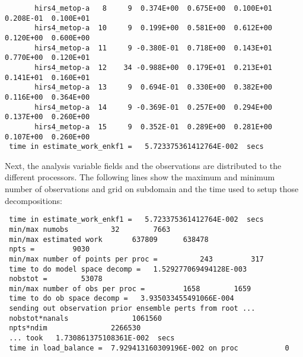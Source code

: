 \begin{scriptsize}
\begin{verbatim}
       hirs4_metop-a   8     9  0.374E+00  0.675E+00  0.100E+01  0.208E-01  0.100E+01
       hirs4_metop-a  10     9  0.199E+00  0.581E+00  0.612E+00  0.120E+00  0.600E+00
       hirs4_metop-a  11     9 -0.380E-01  0.718E+00  0.143E+01  0.770E+00  0.120E+01
       hirs4_metop-a  12    34 -0.988E+00  0.179E+01  0.213E+01  0.141E+01  0.160E+01
       hirs4_metop-a  13     9  0.694E-01  0.330E+00  0.382E+00  0.116E+00  0.364E+00
       hirs4_metop-a  14     9 -0.369E-01  0.257E+00  0.294E+00  0.137E+00  0.260E+00
       hirs4_metop-a  15     9  0.352E-01  0.289E+00  0.281E+00  0.107E+00  0.260E+00
 time in estimate_work_enkf1 =   5.723375361412764E-002  secs
\end{verbatim}
\end{scriptsize}


Next, the analysis variable fields and the observations are distributed to the different processors. The following lines show the maximum and minimum number of observations and grid on subdomain and the time used to setup those decompositions:
\begin{scriptsize}
\begin{verbatim}
 time in estimate_work_enkf1 =   5.723375361412764E-002  secs
 min/max numobs          32        7663
 min/max estimated work       637809      638478
 npts =         9030
 min/max number of points per proc =          243         317
 time to do model space decomp =   1.529277069494128E-003
 nobstot =        53078
 min/max number of obs per proc =         1658        1659
 time to do ob space decomp =   3.935033455491066E-004
 sending out observation prior ensemble perts from root ...
 nobstot*nanals               1061560
 npts*ndim               2266530
 ... took   1.730861375108361E-002  secs
 time in load_balance =  7.929413160309196E-002 on proc           0
\end{verbatim}
\end{scriptsize}


